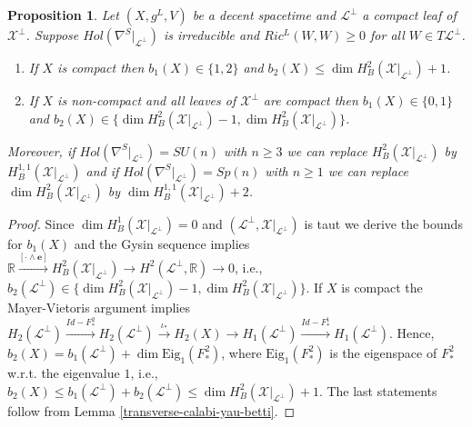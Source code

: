 \documentclass[a4paper,10pt,twoside]{amsart}
\newtheorem{proposition}[theorem]{Proposition}
\theoremstyle{definition}
\theoremstyle{remark}
\numberwithin{equation}{section}
\begin{document}
\begin{proposition}
	Let $(X,g^{L},V)$ be a decent spacetime and $\mathcal{L}^{\perp}$ a compact leaf of $\mathcal{X}^{\perp}$. Suppose
	$Hol(\nabla^{S}|_{\mathcal{L}^{\perp}})$ is irreducible and $Ric^{L}(W,W) \geq 0$ for all $W \in T\mathcal{L}^{\perp}$.
	\begin{enumerate}
		\item
		If $X$ is compact then $b_{1}(X) \in \{1,2\}$ and $b_{2}(X) \leq \dim H^{2}_{B}(\mathcal{X}|_{\mathcal{L}^{\perp}})+1$.
		\item
		If $X$ is non-compact and all leaves of $\mathcal{X}^{\perp}$ are compact then $b_{1}(X) \in \{0,1\}$ and
		$b_{2}(X) \in \{\dim H^{2}_{B}(\mathcal{X}|_{\mathcal{L}^{\perp}})-1,\dim H^{2}_{B}(\mathcal{X}|_{\mathcal{L}^{\perp}})\}$.
	\end{enumerate}
	Moreover, if $Hol(\nabla^{S}|_{\mathcal{L}^{\perp}})=SU(n)$ with $n \geq 3$ we can replace $H^{2}_{B}(\mathcal{X}|_{\mathcal{L}^{\perp}})$
	by $H^{1,1}_{B}(\mathcal{X}|_{\mathcal{L}^{\perp}})$ and if $Hol(\nabla^{S}|_{\mathcal{L}^{\perp}})=Sp(n)$ with $n \geq 1$ we can replace
	$\dim H^{2}_{B}(\mathcal{X}|_{\mathcal{L}^{\perp}})$ by $\dim H^{1,1}_{B}(\mathcal{X}|_{\mathcal{L}^{\perp}}) + 2$.
\end{proposition}
\begin{proof}
	Since $\dim H^{1}_{B}(\mathcal{X}|_{\mathcal{L}^{\perp}})=0$ and $(\mathcal{L}^{\perp},\mathcal{X}|_{\mathcal{L}^{\perp}})$ is taut we derive
	the bounds for $b_{1}(X)$ and the Gysin sequence implies
	${\mathbb{R}} \stackrel{[\cdot \wedge \mathbf{e}]}{\longrightarrow} H^{2}_{B}(\mathcal{X}|_{\mathcal{L}^{\perp}})
			\longrightarrow H^{2}(\mathcal{L}^{\perp},{\mathbb{R}}) \longrightarrow 0$,
	i.e., $b_{2}(\mathcal{L}^{\perp})\in \{\dim H^{2}_{B}(\mathcal{X}|_{\mathcal{L}^{\perp}})-1,\dim H^{2}_{B}(\mathcal{X}|_{\mathcal{L}^{\perp}})\}$.
	If $X$ is compact the Mayer-Vietoris argument implies
	$H_{2}(\mathcal{L}^{\perp}) \stackrel{Id -F^{2}_{*}}{\longrightarrow} H_{2}(\mathcal{L}^{\perp})
				\stackrel{\iota_{*}}{\longrightarrow} H_{2}(X) \longrightarrow H_{1}(\mathcal{L}^{\perp})
					\stackrel{Id -F^{1}_{*}}{\longrightarrow} H_{1}(\mathcal{L}^{\perp})$.
	Hence, $b_{2}(X) = b_{1}(\mathcal{L}^{\perp}) + \dim \mbox{Eig}_{1}(F^{2}_{*})$, where $\mbox{Eig}_{1}(F^{2}_{*})$ is the eigenspace of
	$F^{2}_{*}$ w.r.t. the eigenvalue $1$, i.e.,
	$b_{2}(X) \leq b_{1}(\mathcal{L}^{\perp}) + b_{2}(\mathcal{L}^{\perp}) \leq \dim H^{2}_{B}(\mathcal{X}|_{\mathcal{L}^{\perp}}) +1$.
	The last statements follow from Lemma \ref{transverse-calabi-yau-betti}.
\end{proof}
\end{document}
